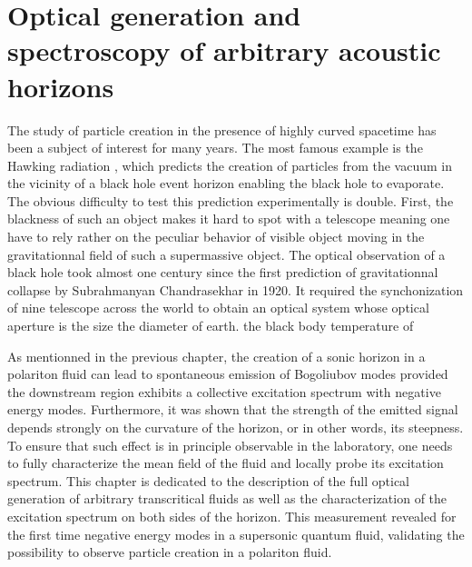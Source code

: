 


\graphicspath{{./}{./fig/}{./chap_custom_st/fig/}}

\chapter{Optical generation and spectroscopy of arbitrary acoustic horizons}

\label{chap:generation_transonic_fluid}

The study of particle creation in the presence of highly curved spacetime has been a subject of interest for many years. The most famous example is the Hawking radiation \cite{hawking_black_1972}, which predicts the creation of particles from the vacuum in the vicinity of a black hole event horizon enabling the black hole 
to evaporate. The obvious difficulty to test this prediction experimentally is double. First, the blackness of such an object makes it hard to spot with a telescope meaning one have to rely rather on the peculiar behavior of visible object moving in the gravitationnal field of such a supermassive object. The optical observation of a black hole took almost one century since the first prediction of gravitationnal collapse by Subrahmanyan Chandrasekhar in 1920. It required 
the synchonization of nine telescope across the world to obtain an optical system whose optical aperture is the size the diameter of earth. the black body temperature of 

As mentionned in the previous chapter, the creation of a sonic horizon in a polariton fluid can lead to spontaneous emission of Bogoliubov modes provided the downstream region exhibits a collective excitation spectrum with
 negative energy modes. Furthermore, it was shown that the strength of the emitted signal depends strongly on the curvature of the horizon, or in other words, its steepness. To ensure that such effect is in principle observable in the laboratory, one needs to fully characterize the mean field of the fluid and locally probe its excitation spectrum. This chapter is dedicated to the description of the full optical generation of arbitrary transcritical fluids as well as the characterization of the excitation spectrum on both sides of the horizon. 
This measurement revealed for the first time negative energy modes in a supersonic quantum fluid, validating the possibility to observe particle creation in a polariton fluid.

